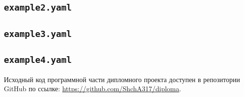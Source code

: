 \begin{appendices}
\subsection{\texttt{example2.yaml}}
\label{app:example2}


\subsection{\texttt{example3.yaml}}
\label{app:example3}


\subsection{\texttt{example4.yaml}}
\label{app:example4}



\label{app:estimators}


Исходный код программной части дипломного проекта доступен в репозитории GitHub по ссылке: 
\url{https://github.com/ShchA317/diploma}.

\end{appendices}